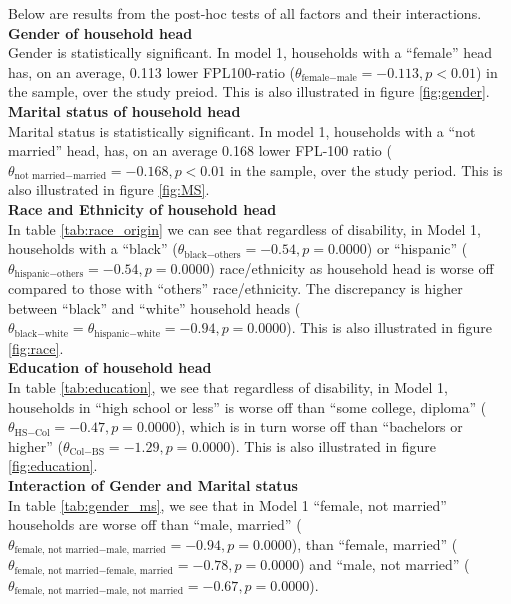 \documentclass[11pt]{extarticle} %
\begin{document}
Below are results from the post-hoc tests of all factors and their interactions.
\noindent
{\bf{Gender of household head}} \\
Gender is statistically significant. In model 1, households with a ``female'' head has, on an average, 0.113 lower FPL100-ratio ($\theta_{\text{female} - \text{male}} = -0.113, p < 0.01$) in the sample, over the study preiod. This is also illustrated in figure \ref{fig:gender}. \\
\noindent
{\bf{Marital status of household head}} \\
Marital status is statistically significant. In model 1, households with a ``not married'' head, has, on an average 0.168 lower FPL-100 ratio ($\theta_{\text{not married} - \text{married}} = -0.168, p < 0.01$ in the sample, over the study period. This is also illustrated in figure \ref{fig:MS}.\\
\noindent
{\bf{Race and Ethnicity of household head}} \\
In table \ref{tab:race_origin} we can see that regardless of disability, in Model 1, households with a ``black'' ($\theta_{\text{black} - \text{others}} = -0.54, p = 0.0000$) or ``hispanic'' ($\theta_{\text{hispanic} - \text{others}} = -0.54, p = 0.0000$) race/ethnicity as household head is worse off compared to those with ``others'' race/ethnicity. The discrepancy is higher between ``black'' and ``white'' household heads ($\theta_{\text{black} - \text{white}} = \theta_{\text{hispanic} - \text{white}} = -0.94, p = 0.0000$). This is also illustrated in figure \ref{fig:race}. \\
\noindent
{\bf{Education of household head}} \\
In table \ref{tab:education}, we see that regardless of disability, in Model 1, households in ``high school or less'' is worse off than ``some college, diploma'' ($\theta_{\text{HS} - \text{Col}} = -0.47, p = 0.0000$), which is in turn worse off than ``bachelors or higher'' ($\theta_{\text{Col} - \text{BS}} = -1.29, p = 0.0000$). This is also illustrated in figure \ref{fig:education}.\\
\noindent
{\bf{Interaction of Gender and Marital status}} \\
In table \ref{tab:gender_ms}, we see that in Model 1 ``female, not married'' households are worse off than ``male, married'' ($\theta_{\text{female, not married} - \text{male, married}} = -0.94, p = 0.0000$), than ``female, married'' ($\theta_{\text{female, not married} - \text{female, married}} = -0.78, p = 0.0000$) and ``male, not married'' ($\theta_{\text{female, not married} - \text{male, not married}} = -0.67, p = 0.0000$). \\
\end{document}
